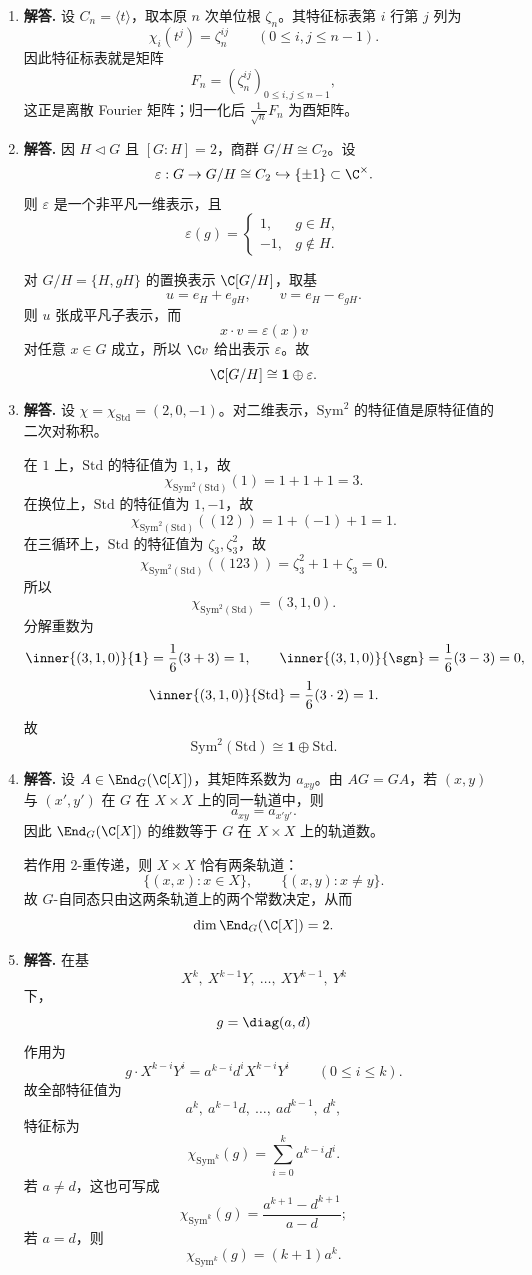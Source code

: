 \begin{enumerate}[label=\textbf{\arabic*.}, leftmargin=*, itemsep=1em]
\item \textbf{解答.} 设 $C_n=\langle t\rangle$，取本原 $n$ 次单位根 $\zeta_n$。其特征标表第 $i$ 行第 $j$ 列为
\[
\chi_i(t^j)=\zeta_n^{ij}\qquad (0\le i,j\le n-1).
\]
因此特征标表就是矩阵
\[
F_n=(\zeta_n^{ij})_{0\le i,j\le n-1},
\]
这正是离散 Fourier 矩阵；归一化后 $\frac1{\sqrt n}F_n$ 为酉矩阵。

\item \textbf{解答.} 因 $H\triangleleft G$ 且 $[G:H]=2$，商群 $G/H\cong C_2$。设
\[
\varepsilon:G\to G/H\cong C_2\hookrightarrow \{\pm1\}\subset \C^\times.
\]
则 $\varepsilon$ 是一个非平凡一维表示，且
\[
\varepsilon(g)=
\begin{cases}
1,& g\in H,\\
-1,& g\notin H.
\end{cases}
\]

对 $G/H=\{H,gH\}$ 的置换表示 $\C[G/H]$，取基
\[
u=e_H+e_{gH},\qquad v=e_H-e_{gH}.
\]
则 $u$ 张成平凡子表示，而
\[
x\cdot v=\varepsilon(x)v
\]
对任意 $x\in G$ 成立，所以 $\C v$ 给出表示 $\varepsilon$。故
\[
\C[G/H]\cong \mathbf1\oplus \varepsilon.
\]

\item \textbf{解答.} 设 $\chi=\chi_{\mathrm{Std}}=(2,0,-1)$。对二维表示，$\mathrm{Sym}^2$ 的特征值是原特征值的二次对称积。

在 $1$ 上，$\mathrm{Std}$ 的特征值为 $1,1$，故
\[
\chi_{\mathrm{Sym}^2(\mathrm{Std})}(1)=1+1+1=3.
\]
在换位上，$\mathrm{Std}$ 的特征值为 $1,-1$，故
\[
\chi_{\mathrm{Sym}^2(\mathrm{Std})}((12))=1+(-1)+1=1.
\]
在三循环上，$\mathrm{Std}$ 的特征值为 $\zeta_3,\zeta_3^2$，故
\[
\chi_{\mathrm{Sym}^2(\mathrm{Std})}((123))
=\zeta_3^2+1+\zeta_3=0.
\]
所以
\[
\chi_{\mathrm{Sym}^2(\mathrm{Std})}=(3,1,0).
\]
分解重数为
\[
\inner{(3,1,0)}{\mathbf1}=\frac16(3+3)=1,\qquad
\inner{(3,1,0)}{\sgn}=\frac16(3-3)=0,
\]
\[
\inner{(3,1,0)}{\mathrm{Std}}=\frac16(3\cdot2)=1.
\]
故
\[
\mathrm{Sym}^2(\mathrm{Std})\cong \mathbf1\oplus \mathrm{Std}.
\]

\item \textbf{解答.} 设 $A\in \End_G(\C[X])$，其矩阵系数为 $a_{xy}$。由 $AG=GA$，若 $(x,y)$ 与 $(x',y')$ 在 $G$ 在 $X\times X$ 上的同一轨道中，则
\[
a_{xy}=a_{x'y'}.
\]
因此 $\End_G(\C[X])$ 的维数等于 $G$ 在 $X\times X$ 上的轨道数。

若作用 $2$-重传递，则 $X\times X$ 恰有两条轨道：
\[
\{(x,x):x\in X\},\qquad \{(x,y):x\neq y\}.
\]
故 $G$-自同态只由这两条轨道上的两个常数决定，从而
\[
\dim \End_G(\C[X])=2.
\]

\item \textbf{解答.} 在基
\[
X^k,\ X^{k-1}Y,\ \dots,\ XY^{k-1},\ Y^k
\]
下，
\[
g=\diag(a,d)
\]
作用为
\[
g\cdot X^{k-i}Y^i=a^{k-i}d^iX^{k-i}Y^i\qquad (0\le i\le k).
\]
故全部特征值为
\[
a^k,\ a^{k-1}d,\ \dots,\ ad^{k-1},\ d^k,
\]
特征标为
\[
\chi_{\mathrm{Sym}^k}(g)=\sum_{i=0}^k a^{k-i}d^i.
\]
若 $a\neq d$，这也可写成
\[
\chi_{\mathrm{Sym}^k}(g)=\frac{a^{k+1}-d^{k+1}}{a-d};
\]
若 $a=d$，则
\[
\chi_{\mathrm{Sym}^k}(g)=(k+1)a^k.
\]


\end{enumerate}

